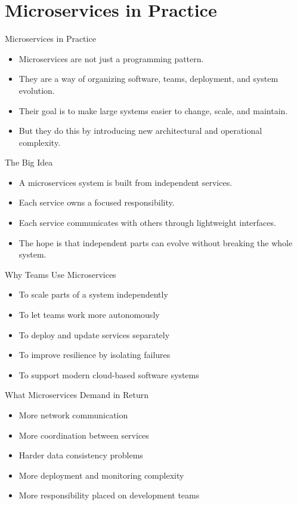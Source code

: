 \section{Microservices in Practice}

\begin{frame}{Microservices in Practice}
\begin{itemize}
    \item Microservices are not just a programming pattern.
    \item They are a way of organizing software, teams, deployment, and system evolution.
    \item Their goal is to make large systems easier to change, scale, and maintain.
    \item But they do this by introducing new architectural and operational complexity.
\end{itemize}
\end{frame}

\begin{frame}{The Big Idea}
\begin{itemize}
    \item A microservices system is built from independent services.
    \item Each service owns a focused responsibility.
    \item Each service communicates with others through lightweight interfaces.
    \item The hope is that independent parts can evolve without breaking the whole system.
\end{itemize}
\end{frame}

\begin{frame}{Why Teams Use Microservices}
\begin{itemize}
    \item To scale parts of a system independently
    \item To let teams work more autonomously
    \item To deploy and update services separately
    \item To improve resilience by isolating failures
    \item To support modern cloud-based software systems
\end{itemize}
\end{frame}

\begin{frame}{What Microservices Demand in Return}
\begin{itemize}
    \item More network communication
    \item More coordination between services
    \item Harder data consistency problems
    \item More deployment and monitoring complexity
    \item More responsibility placed on development teams
\end{itemize}
\end{frame}

